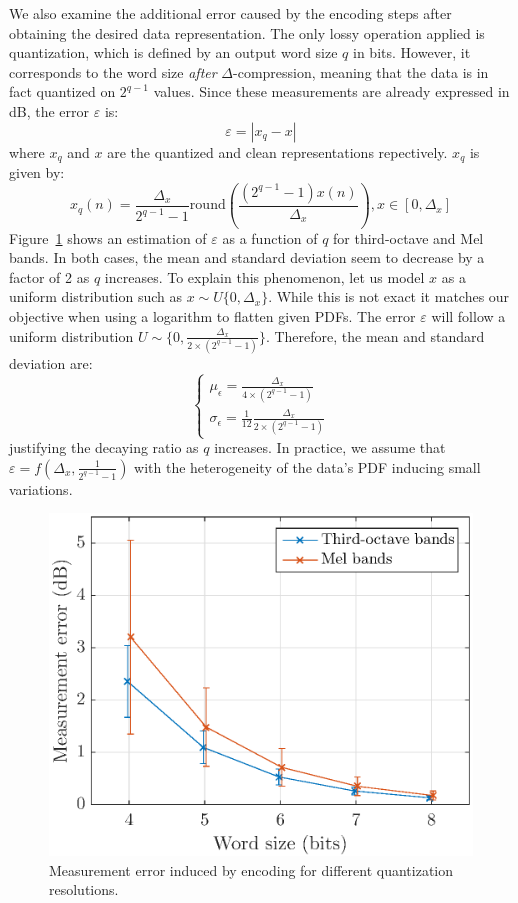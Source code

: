 \documentclass[final,3p,times,twocolumn]{elsarticle}
\begin{document}
We also examine the additional error caused by the encoding steps after obtaining the desired data representation. The only lossy operation applied is quantization, which is defined by an output word size $q$ in bits. However, it corresponds to the word size \textit{after} $\Delta$-compression, meaning that the data is in fact quantized on $2^{q-1}$ values. Since these measurements are already expressed in dB, the error $\varepsilon$ is:
\begin{equation*}
	\varepsilon = |x_q-x|
\end{equation*}
where $x_q$ and $x$ are the quantized and clean representations repectively. $x_q$ is given by:
\begin{equation*}
x_q(n) = \frac{\Delta_x}{2^{q-1}-1}\textrm{round}\left(\frac{(2^{q-1}-1)x(n)}{\Delta_x}\right), x\in \left[0, \Delta_x\right]
\end{equation*}
Figure~\ref{fig:error_q} shows an estimation of $\varepsilon$ as a function of $q$ for third-octave and Mel bands. In both cases, the mean and standard deviation seem to decrease by a factor of 2 as $q$ increases. To explain this phenomenon, let us model $x$ as a uniform distribution such as $x\sim \textit{U}\{0, \Delta_x\}$. While this is not exact it matches our objective when using a logarithm to flatten given PDFs. The error $\varepsilon$ will follow a uniform distribution $U\sim \{0, \frac{\Delta_x}{2\times (2^{q-1}-1)}\}$. Therefore, the mean and standard deviation are:
\[
\begin{cases}
	\mu_\epsilon = \frac{\Delta_x}{4\times (2^{q-1}-1)}\\
	\sigma_\epsilon = \frac{1}{12}\frac{\Delta_x}{2\times (2^{q-1}-1)}
\end{cases}
\]
justifying the decaying ratio as $q$ increases. In practice, we assume that $\varepsilon = f(\Delta_x, \frac{1}{2^{q-1}-1})$ with the heterogeneity of the data's PDF inducing small variations.

\begin{figure}[htbp]
	\centering
		\includegraphics[width=\columnwidth]{figures/error_qall.eps}
	\caption{Measurement error induced by encoding for different quantization resolutions.}
	\label{fig:error_q}
\end{figure}
\end{document}
